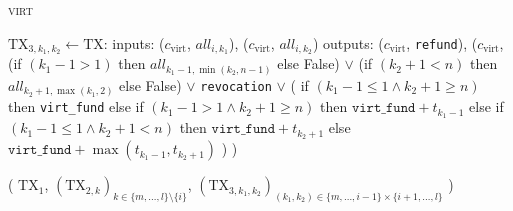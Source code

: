 \begin{center}
\begin{processbox}{\textsc{virt}}
\begin{algorithmic}[1]
          \State $\mathrm{TX}_{3, k_1, k_2} \gets \mathrm{TX}$:
          \Indent
            \State inputs:
            \Indent
              \State ($c_{\mathrm{virt}}$, $\mathit{all}_{i, k_1}$),
              \label{code:virtual-layer:mid-txs:merge-intervals:left-virt-input}
              \State ($c_{\mathrm{virt}}$, $\mathit{all}_{i, k_2}$)
            \EndIndent
            \State outputs:
            \Indent
              \State ($c_{\mathrm{virt}}$, \texttt{refund}),
              \State ($c_{\mathrm{virt}}$,
              \Indent
                \State (if $(k_1-1 > 1)$ then $\mathit{all}_{k_1-1, \min{(k_2,
                n-1)}}$ else False)
                \State $\vee$ (if $(k_2+1 < n)$ then $\mathit{all}_{k_2+1,
                \max{(k_1, 2)}}$ else False)
                \State $\vee$ \texttt{revocation}
                \State $\vee$ (
                \Indent
                  \State if $(k_1-1 \leq 1 \wedge k_2+1 \geq n)$ then
                  \texttt{virt\_fund}
                  \State else if $(k_1-1 > 1 \wedge k_2+1 \geq n)$ then
                  $\texttt{virt\_fund} + t_{k_1-1}$
                  \State else if $(k_1-1 \leq 1 \wedge k_2+1 < n)$ then
                  $\texttt{virt\_fund} + t_{k_2+1}$
                  \State else 
                  \Indent
                    \State $\texttt{virt\_fund} + \max{(t_{k_1-1}, t_{k_2+1})}$
                  \EndIndent
                \EndIndent
                \State )
              \EndIndent
              \State )
            \EndIndent
          \EndIndent
        \EndFor

        \State \Return (
        \Indent
          \State $\mathrm{TX}_1$,
          \State $(\mathrm{TX}_{2, k})_{k \in \{m, \dots, l\} \setminus \{i\}}$,
          \State $(\mathrm{TX}_{3, k_1, k_2})_{(k_1, k_2) \in \{m, \dots, i-1\}
          \times \{i+1, \dots, l\}}$
        \EndIndent
        \State )
      \EndIndent
    \end{algorithmic}
  \end{processbox}
  \label{code:virtual-layer:mid-txs}
\end{center} \ \\

